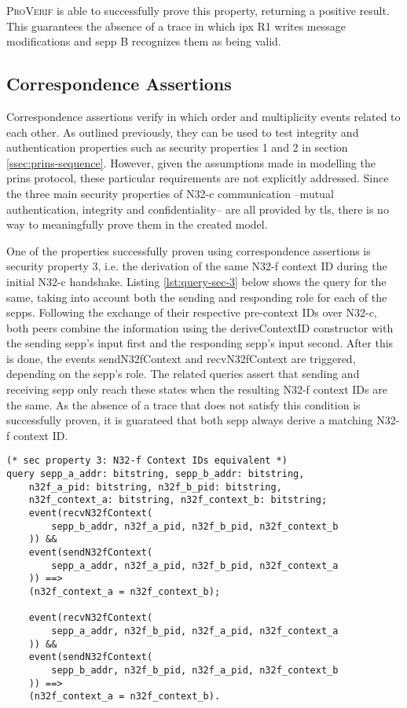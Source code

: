 \textsc{ProVerif} is able to successfully prove this property, returning a positive result.
This guarantees the absence of a trace in which \gls{ipx} R1 writes message modifications and \gls{sepp} B recognizes them as being valid.

\subsection{Correspondence Assertions}

Correspondence assertions verify in which order and multiplicity events related to each other.
As outlined previously, they can be used to test integrity and authentication properties such as security properties 1 and 2 in section \ref{ssec:prins-sequence}.
However, given the assumptions made in modelling the \gls{prins} protocol, these particular requirements are not explicitly addressed.
Since the three main security properties of N32-c communication --mutual authentication, integrity and confidentiality-- are all provided by \gls{tls}, there is no way to meaningfully prove them in the created model.

One of the properties successfully proven using correspondence assertions is security property 3, i.e. the derivation of the same N32-f context ID during the initial N32-c handshake.
Listing \ref{lst:query-sec-3} below shows the query for the same, taking into account both the sending and responding role for each of the \glspl{sepp}.
Following the exchange of their respective pre-context IDs over N32-c, both peers combine the information using the {\sffamily deriveContextID} constructor with the sending \gls{sepp}'s input first and the responding \gls{sepp}'s input second.
After this is done, the events {\sffamily sendN32fContext} and {\sffamily recvN32fContext} are triggered, depending on the \gls{sepp}'s role.
The related queries assert that sending and receiving \gls{sepp} only reach these states when the resulting N32-f context IDs are the same.
As the absence of a trace that does not satisfy this condition is successfully proven, it is guarateed that both \gls{sepp} always derive a matching N32-f context ID.

\begin{lstlisting}[caption={Query for security property 3},label={lst:query-sec-3},firstnumber=221]
(* sec property 3: N32-f Context IDs equivalent *)
query sepp_a_addr: bitstring, sepp_b_addr: bitstring,
    n32f_a_pid: bitstring, n32f_b_pid: bitstring,
    n32f_context_a: bitstring, n32f_context_b: bitstring;
    event(recvN32fContext(
        sepp_b_addr, n32f_a_pid, n32f_b_pid, n32f_context_b
    )) &&
    event(sendN32fContext(
        sepp_a_addr, n32f_a_pid, n32f_b_pid, n32f_context_a
    )) ==>
    (n32f_context_a = n32f_context_b);

    event(recvN32fContext(
        sepp_a_addr, n32f_b_pid, n32f_a_pid, n32f_context_a
    )) &&
    event(sendN32fContext(
        sepp_b_addr, n32f_b_pid, n32f_a_pid, n32f_context_b
    )) ==>
    (n32f_context_a = n32f_context_b).
\end{lstlisting}

